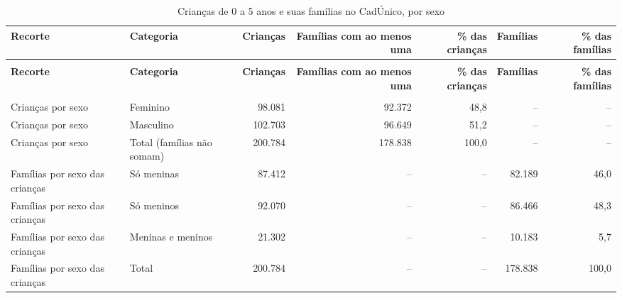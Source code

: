 \begin{apendicesenv}
\begin{landscape}
{\scriptsize\setlength{\tabcolsep}{3pt}
\begin{longtable}{@{}>{\raggedright\arraybackslash}p{3.6cm}>{\raggedright\arraybackslash}p{3.6cm}rrrrr@{}}
\caption{Crianças de 0 a 5 anos e suas famílias no CadÚnico, por sexo}\label{tab:cadunico-por-sexo-2026}\\
\toprule \textbf{Recorte} & \textbf{Categoria} & \textbf{Crianças} & \parbox[b]{2.20cm}{\raggedleft{} \textbf{Famílias com ao menos uma}} & \parbox[b]{2.20cm}{\raggedleft{} \textbf{\% das crianças}} & \textbf{Famílias} & \parbox[b]{2.20cm}{\raggedleft{} \textbf{\% das famílias}} \\ \midrule \endfirsthead
{}\\ \toprule \textbf{Recorte} & \textbf{Categoria} & \textbf{Crianças} & \parbox[b]{2.20cm}{\raggedleft{} \textbf{Famílias com ao menos uma}} & \parbox[b]{2.20cm}{\raggedleft{} \textbf{\% das crianças}} & \textbf{Famílias} & \parbox[b]{2.20cm}{\raggedleft{} \textbf{\% das famílias}} \\ \midrule \endhead
\midrule {}\\ \endfoot
\bottomrule \endlastfoot
Crianças por sexo & Feminino & 98.081 & 92.372 & 48,8 & -- & -- \\
Crianças por sexo & Masculino & 102.703 & 96.649 & 51,2 & -- & -- \\
Crianças por sexo & Total (famílias não somam) & 200.784 & 178.838 & 100,0 & -- & -- \\
Famílias por sexo das crianças & Só meninas & 87.412 & -- & -- & 82.189 & 46,0 \\
Famílias por sexo das crianças & Só meninos & 92.070 & -- & -- & 86.466 & 48,3 \\
Famílias por sexo das crianças & Meninas e meninos & 21.302 & -- & -- & 10.183 & 5,7 \\
Famílias por sexo das crianças & Total & 200.784 & -- & -- & 178.838 & 100,0 \\
\end{longtable}}
\vspace{-6pt}
\end{landscape}



\end{apendicesenv}
